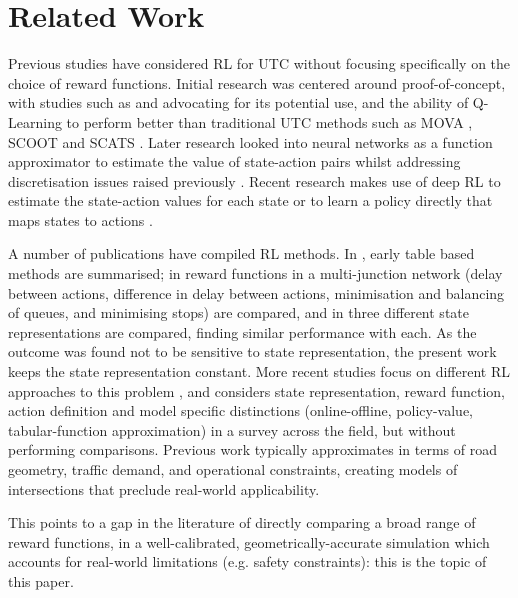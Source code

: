 \documentclass[conference]{IEEEtran}
\begin{document}
\section{Related Work} \label{lit}
Previous studies have considered RL for UTC without focusing specifically on the choice of reward functions.
Initial research was centered around proof-of-concept, with studies such as \cite{wiering2000} and \cite{abdulhai2003} advocating for its potential use, and the ability of Q-Learning to perform better \cite{abdulhai2010} \cite{prashanth2011} than traditional UTC methods such as MOVA \cite{MOVA}, SCOOT \cite{SCOOT} and SCATS \cite{SCATS}. 
Later research looked into neural networks as a function approximator to estimate the value of state-action pairs whilst addressing discretisation issues raised previously \cite{richter2007} \cite{araghi2013}.
Recent research makes use of deep RL to estimate the state-action values for each state \cite{mannion} \cite{vanderpol2016} \cite{genders2016} \cite{gao2017} \cite{wan2018} \cite{liang2018} \cite{zhou2019} or to learn a policy directly that maps states to actions \cite{richter2007} \cite{mousavi2017} \cite{genders2018} \cite{gendersthesis} \cite{aslani2019}.

A number of publications have compiled RL methods. In \cite{rlparam}, early table based methods are summarised; in \cite{mannion} reward functions in a multi-junction network (delay between actions, difference in delay between actions, minimisation and balancing of queues, and minimising stops) are compared, and in \cite{genders2018} three different state representations are compared, finding similar performance with each. As the outcome was found not to be sensitive to state representation, the present work keeps the state representation constant. More recent studies focus on different RL approaches to this problem \cite{yau}, and \cite{wei2019} considers state representation, reward function, action definition and model specific distinctions (online-offline, policy-value, tabular-function approximation) in a survey across the field, but without performing comparisons.
Previous work typically approximates in terms of road geometry, traffic demand, and operational constraints, creating models of intersections that preclude real-world applicability.

This points to a gap in the literature of directly comparing a broad range of reward functions, in a well-calibrated, geometrically-accurate simulation which accounts for real-world limitations (e.g. safety constraints): this is the topic of this paper.
\end{document}
